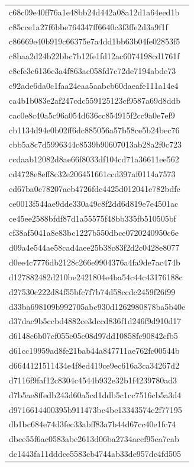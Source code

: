 \begin{tabular}{l}
c68c09e40ff76a1e48bb24d442a08a12d1a64eed1b \\
c85cce1a27f6bbe764347ff6640c3f3ffe2d3a9f1f \\
c86669e40b919c66375e7a4dd1bb63b04fe02853f5 \\
c8baa2d24b22bbc7b12fe1fd12ac6074198cd1761f \\
c8cfe3c6136c3a4f863ac058fd7c72de7194abde73 \\
c92ade6da0c1faa24eaa5aabcb60daeafe111a14e4 \\
ca4b1b083e2af247cdc559125123cf9587a69d8ddb \\
cac0e8c40a5c96a054d636cc854915f2cc9a0e7ef9 \\
cb1134d94e0b02ff6dc885056a57b58ce5b24bec76 \\
cbb5a8c7d5996344c8539b90607013ab28a2f0c723 \\
ccdaab12082d8ae66f8033df104cd71a36611ee562 \\
cd4728e8eff8c32e206451661ccd397af0114a7573 \\
cd67ba0c78207aeb4726fdc4425d012041e782bdfc \\
ce0013f544ae9dde330a49c8f2dd6d819e7e4501ac \\
ce45ee2588bfdf87d1a55575f48bb335fb510505bf \\
cf38af5041a8e83bc1227b550dbce0720240950c6e \\
d09a4e544ae58cad4aee25b38c83f2d2c0428e8077 \\
d0ee4c7776db2128c266e9904376a4fa9de7ac474b \\
d127882482d210be2421804e4ba54c44c43176188c \\
d27530c222d84f55bfc7f7b74d58ccdc2459f26f99 \\
d33ba698109b992705abc930d1262980878ba5b40e \\
d37dac9b5ccbd4882ce3dccd836f1d246f9d910d17 \\
d6148c6b07cf055e05e08d97dd10858fc90842cfb5 \\
d61cc19959ad8fe21bab44a847711ae762fc00544b \\
d6644121511434e4f8ed419ce9ec616a3ca34267d2 \\
d7116f9faf12c8304c4544b932e32b1f4239780ad3 \\
d7b5ae8ffedb243d60a5cd1ddb5c1cc7516cb5a3d4 \\
d9716614400395b911473bc4be13343574c2f77195 \\
db1bc684e74d3fec33abff83a7b44d67cc40e1fc74 \\
dbee55f6ac0583abe2613d06ba2734accf95ea7cab \\
dc1443fa11dddce5583cb4744ab33de957dc4fd505 \\

\end{tabular}
